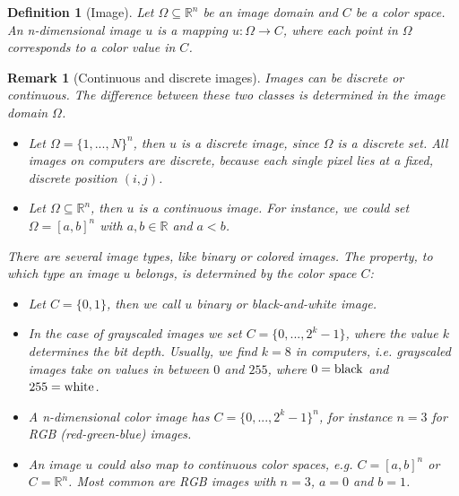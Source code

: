 \documentclass[abstracton]{scrreprt}
\newtheorem{definition}[theorem]{Definition}
\newtheorem{remark}[theorem]{Remark}
\begin{document}
        \begin{definition}[Image] %
        \label{def:image}
            Let $\Omega \subseteq \mathbb{R}^{n}$ be an image domain and $C$ be a color space. An n-dimensional image $u$ is a mapping $u: \Omega \longrightarrow C$, where each point in $\Omega$ corresponds to a color value in $C$.
        \end{definition}
        \begin{remark}[Continuous and discrete images] %
        \label{rem:continuous_vs_discrete}
            Images can be discrete or continuous. The difference between these two classes is determined in the image domain $\Omega$.
                \begin{itemize}
                    \item Let $\Omega = \{ 1, ..., N \}^{n}$, then $u$ is a discrete image, since $\Omega$ is a discrete set. All images on computers are discrete, because each single pixel lies at a fixed, discrete position $(i,j)$.
                    \item Let $\Omega \subseteq \mathbb{R}^{n}$, then $u$ is a continuous image. For instance, we could set $\Omega = [a, b]^{n}$ with $a, b \in \mathbb{R}$ and $a < b$.
                \end{itemize}
            There are several image types, like binary or colored images. The property, to which type an image $u$ belongs, is determined by the color space $C$:
                \begin{itemize}
                    \item Let $C = \{ 0, 1 \}$, then we call $u$ binary or black-and-white image.
                    \item In the case of grayscaled images we set $C = \{ 0, ..., 2^{k}-1 \}$, where the value $k$ determines the bit depth. Usually, we find $k = 8$ in computers, i.e. grayscaled images take on values in between $0$ and $255$, where $0 = \textnormal{black}$ and $255 = \textnormal{white}$.
                    \item A n-dimensional color image has $C = \{ 0, ..., 2^{k}-1 \}^{n}$, for instance $n = 3$ for RGB (red-green-blue) images.
                    \item An image $u$ could also map to continuous color spaces, e.g. $C = [a, b]^{n}$ or $C = \mathbb{R}^{n}$. Most common are RGB images with $n = 3$, $a = 0$ and $b = 1$.
                \end{itemize}
        \end{remark}
\end{document}
